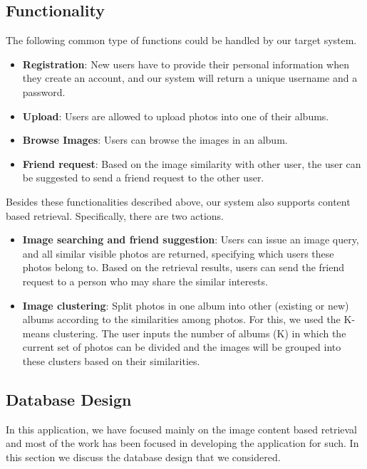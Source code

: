 \documentclass[10pt,twocolumn,letterpaper]{article}
\begin{document}
\subsection{Functionality}
The following common type of functions could be handled by our target system.

\begin{itemize}
  \item \textbf{Registration}: 
  New users have to provide their personal information when they create an account, and our system will return a unique username and a password.
  \item \textbf{Upload}: 
  Users are allowed to upload photos into one of their albums. 
  \item \textbf{Browse Images}: 
  Users can browse the images in an album.
  \item \textbf{Friend request}: 
  Based on the image similarity with other user, the user can be suggested to send a friend request to the other user.
\end{itemize}

Besides these functionalities described above, our system also supports content based retrieval. Specifically, there are two actions. 

\begin{itemize}
  \item \textbf{Image searching and friend suggestion}: 
  Users can issue an image query, and all similar visible photos are returned, specifying which users these photos belong to. Based on the retrieval results, users can send the friend request to a person who may share the similar interests.
  \item \textbf{Image clustering}: 
  Split photos in one album into other (existing or new) albums according to the similarities among photos. For this, we used the K-means clustering. The user inputs the number of albums (K) in which the current set of photos can be divided and the images will be grouped into these clusters based on their similarities.
\end{itemize}

\subsection{Database Design}
In this application, we have focused mainly on the image content based retrieval and most of the work has been focused in developing the application for such. In this section we discuss the database design that we considered.
\end{document}
